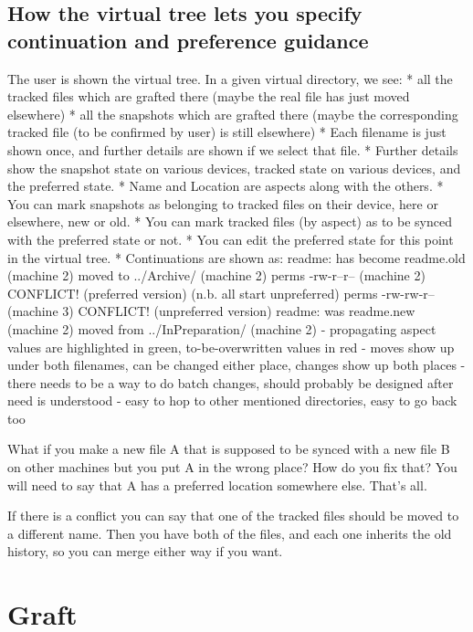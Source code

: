 \documentclass{book}
\begin{document}
\subsection{How the virtual tree lets you specify continuation and preference guidance}

The user is shown the virtual tree.  In a given virtual directory, we see:
	* all the tracked files which are grafted there (maybe the real file has just moved elsewhere)
	* all the snapshots which are grafted there (maybe the corresponding tracked file (to be confirmed by user) is still elsewhere)
	* Each filename is just shown once, and further details are shown if we select that file.
	* Further details show the snapshot state on various devices, tracked state on various devices, and the preferred state.
	* Name and Location are aspects along with the others.
	* You can mark snapshots as belonging to tracked files on their device, here or elsewhere, new or old.
	* You can mark tracked files (by aspect) as to be synced with the preferred state or not.
	* You can edit the preferred state for this point in the virtual tree.
	* Continuations are shown as:
		readme:
			has become readme.old (machine 2)
			moved to ../Archive/ (machine 2)
			perms -rw-r--r-- (machine 2) CONFLICT! (preferred version) (n.b. all start unpreferred)
			perms -rw-rw-r-- (machine 3) CONFLICT! (unpreferred version)
		readme:
			was readme.new (machine 2)
			moved from ../InPreparation/ (machine 2)
		- propagating aspect values are highlighted in green, to-be-overwritten values in red
		- moves show up under both filenames, can be changed either place, changes show up both places
		- there needs to be a way to do batch changes, should probably be designed after need is understood
		- easy to hop to other mentioned directories, easy to go back too


What if you make a new file A that is supposed to be synced with a new file B on other machines but you put A in the wrong place?  How do you fix that?  You will need to say that A has a preferred location somewhere else.  That's all.

If there is a conflict you can say that one of the tracked files should be moved to a different name.  Then you have both of the files, and each one inherits the old history, so you can merge either way if you want.



\section{Graft}
\end{document}
